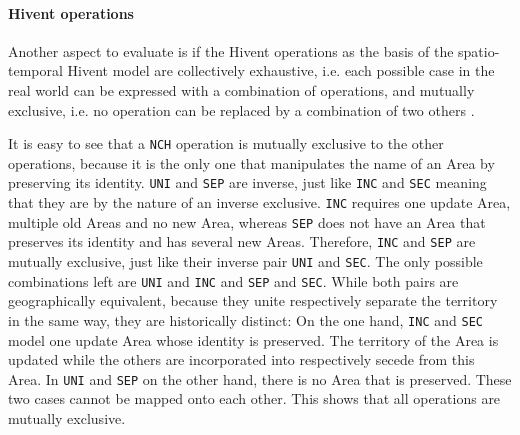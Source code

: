 
\paragraph{Hivent operations} %
\label{par:hivent_operations}

Another aspect to evaluate is if the Hivent operations as the basis of the spatio-temporal Hivent model are collectively exhaustive, i.e. each possible case in the real world can be expressed with a combination of operations, and mutually exclusive, i.e. no operation can be replaced by a combination of two others \cite{mece}.

It is easy to see that a \texttt{NCH} operation is mutually exclusive to the other operations, because it is the only one that manipulates the name of an Area by preserving its identity. \texttt{UNI} and \texttt{SEP} are inverse, just like \texttt{INC} and \texttt{SEC} meaning that they are by the nature of an inverse exclusive. \texttt{INC} requires one update Area, multiple old Areas and no new Area, whereas \texttt{SEP} does not have an Area that preserves its identity and has several new Areas. Therefore, \texttt{INC} and \texttt{SEP} are mutually exclusive, just like their inverse pair \texttt{UNI} and \texttt{SEC}.
The only possible combinations left are \texttt{UNI} and \texttt{INC} and \texttt{SEP} and \texttt{SEC}. While both pairs are geographically equivalent, because they unite respectively separate the territory in the same way, they are historically distinct: On the one hand, \texttt{INC} and \texttt{SEC} model one update Area whose identity is preserved. The territory of the Area is updated while the others are incorporated into respectively secede from this Area. In \texttt{UNI} and \texttt{SEP} on the other hand, there is no Area that is preserved. These two cases cannot be mapped onto each other. This shows that all operations are mutually exclusive.


